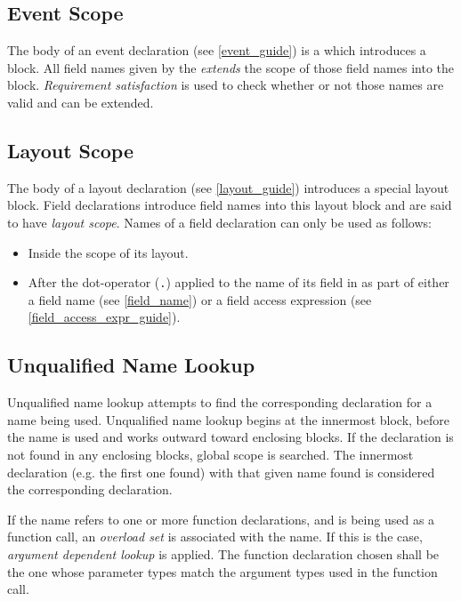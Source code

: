 \subsection{Event Scope} \label{event_scope}

The body of an event declaration (see \ref{event_guide}) is a  which introduces a block. All field names given by the  \textit{extends} the scope of those field names into the block. \textit{Requirement satisfaction} is used to check whether or not those names are valid and can be extended.

\subsection{Layout Scope} \label{layout_scope}

The body of a layout declaration (see \ref{layout_guide}) introduces a special layout block. Field declarations introduce field names into this layout block and are said to have \textit{layout scope}. Names of a field declaration can only be used as follows:

\begin{itemize}
\item Inside the scope of its layout.
\item After the dot-operator (\texttt{.}) applied to the name of its field in as part of either a field name (see \ref{field_name}) or a field access expression (see \ref{field_access_expr_guide}).
\end{itemize}

\subsection{Unqualified Name Lookup} \label{unqlfd_lookup}

Unqualified name lookup attempts to find the corresponding declaration for a name being used. Unqualified name lookup begins at the innermost block, before the name is used and works outward toward enclosing blocks. If the declaration is not found in any enclosing blocks, global scope is searched. The innermost declaration (e.g. the first one found) with that given name found is considered the corresponding declaration.

If the name refers to one or more function declarations, and is being used as a function call, an \textit{overload set} is associated with the name. If this is the case, \textit{argument dependent lookup} is applied. The function declaration chosen shall be the one whose parameter types match the argument types used in the function call.

